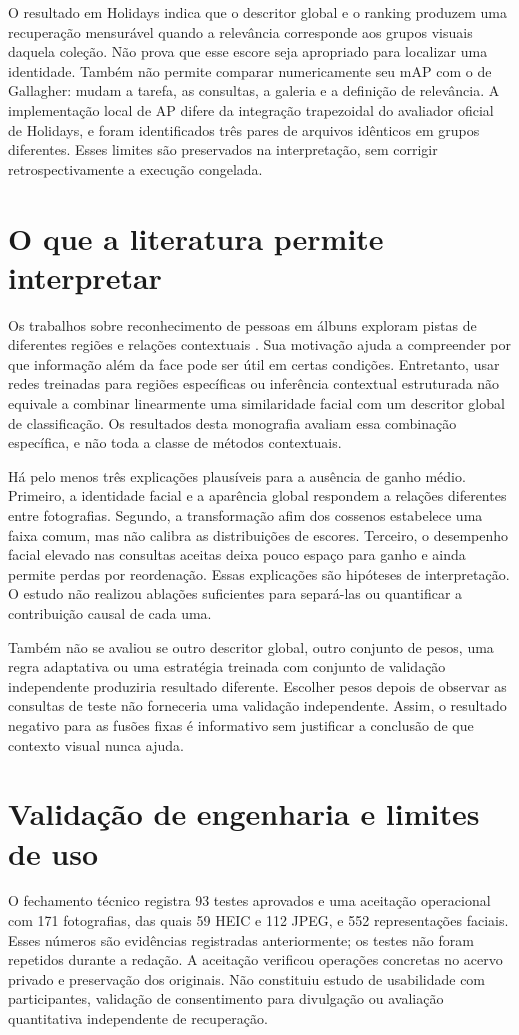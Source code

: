 O resultado em Holidays indica que o descritor global e o ranking produzem uma recuperação mensurável quando a relevância corresponde aos grupos visuais daquela coleção. Não prova que esse escore seja apropriado para localizar uma identidade. Também não permite comparar numericamente seu mAP com o de Gallagher: mudam a tarefa, as consultas, a galeria e a definição de relevância. A implementação local de AP difere da integração trapezoidal do avaliador oficial de Holidays, e foram identificados três pares de arquivos idênticos em grupos diferentes. Esses limites são preservados na interpretação, sem corrigir retrospectivamente a execução congelada.

\section{O que a literatura permite interpretar}
Os trabalhos sobre reconhecimento de pessoas em álbuns exploram pistas de diferentes regiões e relações contextuais \cite{Zhang2015,Oh2015,Li2016}. Sua motivação ajuda a compreender por que informação além da face pode ser útil em certas condições. Entretanto, usar redes treinadas para regiões específicas ou inferência contextual estruturada não equivale a combinar linearmente uma similaridade facial com um descritor global de classificação. Os resultados desta monografia avaliam essa combinação específica, e não toda a classe de métodos contextuais.

Há pelo menos três explicações plausíveis para a ausência de ganho médio. Primeiro, a identidade facial e a aparência global respondem a relações diferentes entre fotografias. Segundo, a transformação afim dos cossenos estabelece uma faixa comum, mas não calibra as distribuições de escores. Terceiro, o desempenho facial elevado nas consultas aceitas deixa pouco espaço para ganho e ainda permite perdas por reordenação. Essas explicações são hipóteses de interpretação. O estudo não realizou ablações suficientes para separá-las ou quantificar a contribuição causal de cada uma.

Também não se avaliou se outro descritor global, outro conjunto de pesos, uma regra adaptativa ou uma estratégia treinada com conjunto de validação independente produziria resultado diferente. Escolher pesos depois de observar as consultas de teste não forneceria uma validação independente. Assim, o resultado negativo para as fusões fixas é informativo sem justificar a conclusão de que contexto visual nunca ajuda.

\section{Validação de engenharia e limites de uso}
O fechamento técnico registra 93 testes aprovados e uma aceitação operacional com 171 fotografias, das quais 59 HEIC e 112 JPEG, e 552 representações faciais. Esses números são evidências registradas anteriormente; os testes não foram repetidos durante a redação. A aceitação verificou operações concretas no acervo privado e preservação dos originais. Não constituiu estudo de usabilidade com participantes, validação de consentimento para divulgação ou avaliação quantitativa independente de recuperação.

